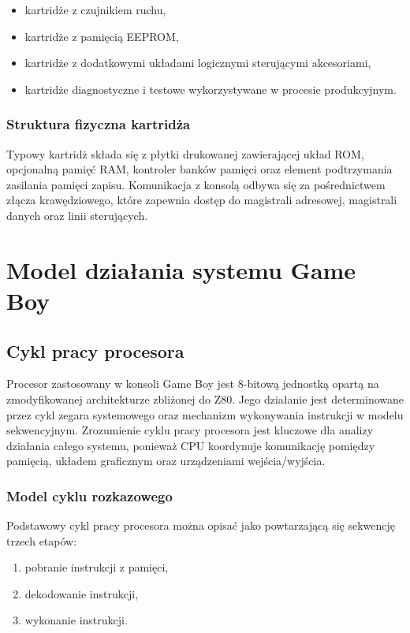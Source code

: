 \documentclass{article}
\begin{document}
\begin{itemize}
	\item kartridże z czujnikiem ruchu,
	\item kartridże z pamięcią EEPROM,
	\item kartridże z dodatkowymi układami logicznymi sterującymi akcesoriami,
	\item kartridże diagnostyczne i testowe wykorzystywane w procesie produkcyjnym.
\end{itemize}

\subsubsection{Struktura fizyczna kartridża}

Typowy kartridż składa się z płytki drukowanej zawierającej układ ROM, opcjonalną pamięć RAM, kontroler banków pamięci oraz element podtrzymania zasilania pamięci zapisu. Komunikacja z konsolą odbywa się za pośrednictwem złącza krawędziowego, które zapewnia dostęp do magistrali adresowej, magistrali danych oraz linii sterujących.

\section{Model działania systemu Game Boy}
\subsection{Cykl pracy procesora}

Procesor zastosowany w konsoli Game Boy jest 8-bitową jednostką opartą na zmodyfikowanej architekturze zbliżonej do Z80. Jego działanie jest determinowane przez cykl zegara systemowego oraz mechanizm wykonywania instrukcji w modelu sekwencyjnym. Zrozumienie cyklu pracy procesora jest kluczowe dla analizy działania całego systemu, ponieważ CPU koordynuje komunikację pomiędzy pamięcią, układem graficznym oraz urządzeniami wejścia/wyjścia.

\subsubsection{Model cyklu rozkazowego}

Podstawowy cykl pracy procesora można opisać jako powtarzającą się sekwencję trzech etapów:
\begin{enumerate}
	\item pobranie instrukcji z pamięci,
	\item dekodowanie instrukcji,
	\item wykonanie instrukcji.
\end{enumerate}
\end{document}
